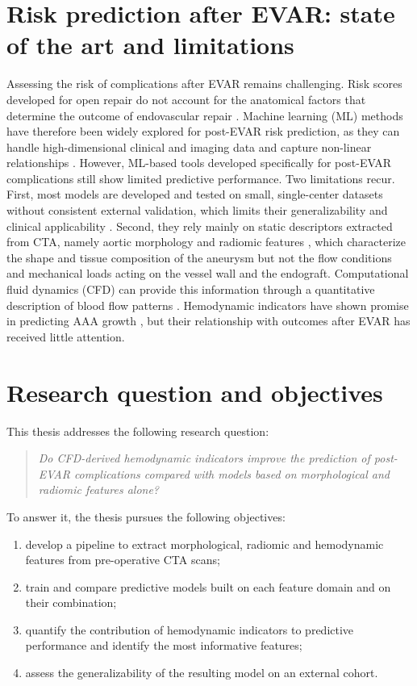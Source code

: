 \section{Risk prediction after EVAR: state of the art and limitations}
Assessing the risk of complications after EVAR remains challenging. Risk scores developed for open repair do not account for the anatomical factors that determine the outcome of endovascular repair \citeneeded{}. Machine learning (ML) methods have therefore been widely explored for post-EVAR risk prediction, as they can handle high-dimensional clinical and imaging data and capture non-linear relationships \cite{braak_scoping_2026, collins_tripodai_2024}.
However, ML-based tools developed specifically for post-EVAR complications still show limited predictive performance. Two limitations recur. First, most models are developed and tested on small, single-center datasets without consistent external validation, which limits their generalizability and clinical applicability \cite{REF19}. Second, they rely mainly on static descriptors extracted from CTA, namely aortic morphology and radiomic features \cite{braak_scoping_2026, REF13, REF20, REF18}, which characterize the shape and tissue composition of the aneurysm but not the flow conditions and mechanical loads acting on the vessel wall and the endograft.
Computational fluid dynamics (CFD) can provide this information through a quantitative description of blood flow patterns \cite{katsoudas_hemodynamic_2026, REF21}. Hemodynamic indicators have shown promise in predicting AAA growth \cite{REF15, REF28, REF12, REF9}, but their relationship with outcomes after EVAR has received little attention.

\section{Research question and objectives}
This thesis addresses the following research question:
\begin{quote}
\emph{Do CFD-derived hemodynamic indicators improve the prediction of post-EVAR complications compared with models based on morphological and radiomic features alone?}
\end{quote}
To answer it, the thesis pursues the following objectives:
\begin{enumerate}
    \item develop a pipeline to extract morphological, radiomic and hemodynamic features from pre-operative CTA scans; %
    \item train and compare predictive models built on each feature domain and on their combination;
    \item quantify the contribution of hemodynamic indicators to predictive performance and identify the most informative features;
    \item assess the generalizability of the resulting model on an external cohort. %
\end{enumerate}